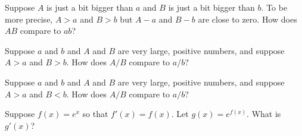 \documentclass{ximera}
\newcommand{\recommendation}[1]{}
\begin{document}
\begin{problem}
  Suppose $A$ is just a bit bigger than $a$ and $B$ is just a bit
  bigger than $b$.  To be more precise, $A > a$ and $B > b$ but
  $A - a$ and $B-b$ are close to zero.  How does $AB$ compare to $ab$?
  \begin{multipleChoice}
  \end{multipleChoice}
\end{problem}

\begin{problem}
  Suppose $a$ and $b$ and $A$ and $B$ are very large, positive numbers, and suppose $A > a$ and $B > b$.  How does $A/B$ compare to $a/b$?
  \begin{multipleChoice}
  \end{multipleChoice}
\end{problem}

\begin{problem}
  Suppose $a$ and $b$ and $A$ and $B$ are very large, positive numbers, and suppose $A > a$ and $B < b$.  How does $A/B$ compare to $a/b$?
  \begin{multipleChoice}
  \end{multipleChoice}
\end{problem}



\begin{problem}
  Suppose $f(x) = e^x$ so that $f'(x) = f(x)$.  Let $g(x) = e^{f(x)}$.  What is $g'(x)$?
  \begin{multipleChoice}
  \end{multipleChoice}
\end{problem}
\end{document}
